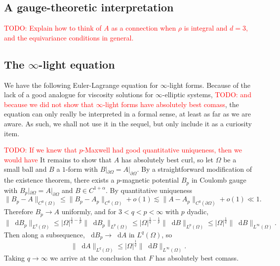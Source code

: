 \documentclass[reqno,11pt]{amsart}
\newcommand*\dif{\mathop{}\!\mathrm{d}}
\theoremstyle{definition}
\numberwithin{equation}{section}
\newcommand\todo[1]{\textcolor{red}{TODO: #1}}
\begin{document}
\subsection{A gauge-theoretic interpretation}
\todo{Explain how to think of $A$ as a connection when $\rho$ is integral and $d = 3$, and the equivariance conditions in general.}


\subsection{The \texorpdfstring{$\infty$-light equation}{infinity-light equation}}
We have the following Euler-Lagrange equation for $\infty$-light forms.
Because of the lack of a good analogue for viscosity solutions for $\infty$-elliptic systems, \todo{and because we did not show that $\infty$-light forms have absolutely best comass}, the equation can only really be interpreted in a formal sense, at least as far as we are aware.
As such, we shall not use it in the sequel, but only include it as a curiosity item.


\todo{If we knew that $p$-Maxwell had good quantitative uniqueness, then we would have}
It remains to show that $A$ has absolutely best curl, so let $\Omega$ be a small ball and $B$ a $1$-form with $B|_{\partial \Omega} = A|_{\partial \Omega}$.
By a straightforward modification of the existence theorem, there exists a $p$-magnetic potential $B_p$ in Coulomb gauge with $B_p|_{\partial \Omega} = A|_{\partial \Omega}$ and $B \in C^{1 + \alpha}$.
By quantitative uniqueness
$$\|B_p - A\|_{C^0(\Omega)} \leq \|B_p - A_p\|_{C^0(\Omega)} + o(1) \lesssim \|A - A_p\|_{C^0(\partial \Omega)} + o(1) \ll 1.$$
Therefore $B_p \to A$ uniformly, and for $3 < q < p < \infty$ with $p$ dyadic,
$$\|\dif B_p\|_{L^q(\Omega)} \leq |\Omega|^{\frac{1}{q} -\frac{1}{p}} \|\dif B_p\|_{L^p(\Omega)} \leq |\Omega|^{\frac{1}{q} -\frac{1}{p}} \|\dif B\|_{L^p(\Omega)} \leq |\Omega|^{\frac{1}{q}} \|\dif B\|_{L^\infty(\Omega)}.$$
Then along a subsequence, $\dif B_p \to \dif A$ in $L^q(\Omega)$, so 
$$\|\dif A\|_{L^q(\Omega)} \leq |\Omega|^{\frac{1}{q}} \|\dif B\|_{L^\infty(\Omega)}.$$
Taking $q \to \infty$ we arrive at the conclusion that $F$ has absolutely best comass.
\end{document}

